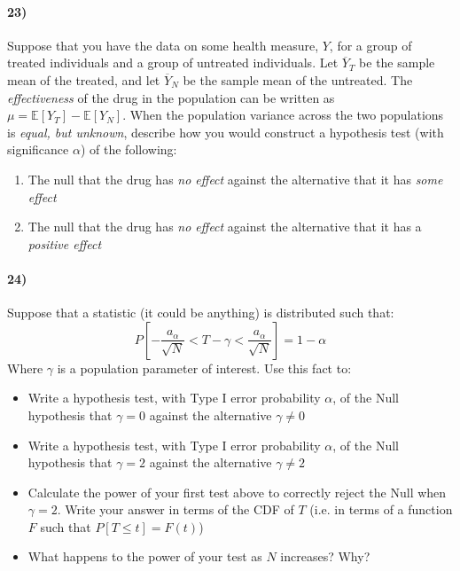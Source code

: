 \documentclass[12pt]{article}
\newcommand\ov{\overline}
\newcommand\EE{\mathbb{E}}
\numberwithin{equation}{section}
\numberwithin{figure}{section}
\numberwithin{table}{section}
\begin{document}
\paragraph{23)} Suppose that you have the data on some health measure, $Y$, for a group of treated individuals and a group of untreated individuals. Let $\ov{Y}_T$ be the sample mean of the treated, and let $\ov{Y}_N$ be the sample mean of the untreated. The \emph{effectiveness} of the drug in the population can be written as $\mu=\EE[Y_T]-\EE[Y_N]$. When the population variance across the two populations is \emph{equal, but unknown}, describe how you would construct a hypothesis test (with significance $\alpha$) of the following:
\begin{enumerate}
\item The null that the drug has \emph{no effect} against the alternative that it has \emph{some effect}
\item The null that the drug has \emph{no effect} against the alternative that it has a \emph{positive effect}
\end{enumerate}

\paragraph{24)} Suppose that a statistic (it could be anything) is distributed such that:
\[P[-\frac{a_\alpha}{\sqrt{N}} < T-\gamma < \frac{a_\alpha}{\sqrt{N}}]=1-\alpha\]
Where $\gamma$ is a population parameter of interest. Use this fact to:
\begin{itemize}
\item Write a hypothesis test, with Type I error probability $\alpha$, of the Null hypothesis that $\gamma=0$ against the alternative $\gamma\neq 0$
\item Write a hypothesis test, with Type I error probability $\alpha$, of the Null hypothesis that $\gamma=2$ against the alternative $\gamma\neq 2$
\item Calculate the power of your first test above to correctly reject the Null when $\gamma = 2$. Write your answer in terms of the CDF of $T$ (i.e. in terms of a function $F$ such that $P[T\leq t] = F(t)$)
\item What happens to the power of your test as $N$ increases? Why?
\end{itemize}
\end{document}
